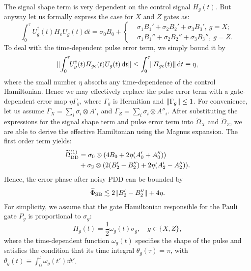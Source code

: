 \documentclass[b5paper,11pt]{article}
\newcommand{\wt}[1]{\widetilde{#1}}
\newcommand{\rDD}{\mathrm{DD}}
\begin{document}
The signal shape term is very dependent on the control signal $H_g(t)$. But anyway let us formally express the case for $X$ and $Z$ gates as:
\begin{equation}
\int_0^\tau\!\! U_g^\dagger(t) H_e U_g(t) \dd t =\sigma_0 B_0  +  \left\{
 \begin{aligned}
   & \sigma_1 B_1' + \sigma_2 B_2'+\sigma_3 B_3',\ g=X;\\
    &\sigma_1 B_1'' + \sigma_2 B_2''+\sigma_3 B_3'',\ g=Z.
 \end{aligned}
 \right.
\end{equation}
To deal with the time-dependent pulse error term,  we simply bound it by
\begin{equation}
 \Vert {\int_0^\tau\!\! U_g^\dagger(t) H_{ge}(t) U_g(t) \mathop{}\!\mathrm{d}t} \Vert 
 \le  \int_0^\tau\!\! \Vert {H_{ge}(t)} \Vert \mathop{}\!\mathrm{d} t \equiv  \eta,
\end{equation}
where the small number $\eta$ absorbs any time-dependence of the control Hamiltonian.
Hence we may effectively replace the pulse error term with a gate-dependent error map $\eta \Gamma_g$, where $\Gamma_g$ is Hermitian and $\Vert {\Gamma_g} \Vert\le 1$. For convenience, let us assume 
$\Gamma_X = \sum_i \sigma_i \otimes A'_i$ and
$\Gamma_Z = \sum_i \sigma_i \otimes A''_i$.
After substituting the expressions for the signal shape term and pulse error term into $\wt\Omega_X$ and $\wt\Omega_Z$, we are able to derive the 
effective Hamiltonian using the Magnus expansion. 
The first order term yields:
\begin{equation}
\begin{aligned}
  \wt\Omega_{\rDD}\up{1}&= 
  \sigma_0\otimes (4B_0 + 2\eta (A_0'+A_0''))\\
 &+\sigma_2 \otimes (2(B_2' -B_2'')+2\eta(A_2'-A_2'')).
\end{aligned}
\end{equation}
Hence, the error phase after noisy PDD can be bounded by
\begin{equation}
\begin{aligned}
  \wt\Phi_\rSB \lesssim 2\norm{B_2' -B_2''} + 4\eta.
\end{aligned}
\end{equation}
For simplicity, we assume that the gate Hamiltonian responsible for the Pauli gate $P_g$ is proportional to $\sigma_g$:
\begin{equation}
 H_g(t) = \frac{1}{2}\omega_g(t)\sigma_g,\quad g\in\{X,Z\},
\end{equation}
where the time-dependent function $\omega_g(t)$ specifies the shape of the pulse and satisfies the condition that its time integral $\theta_g(\tau)=\pi$, with $\theta_g(t)\equiv \int_0^t \omega_g(t') \dd t'$.
\end{document}
